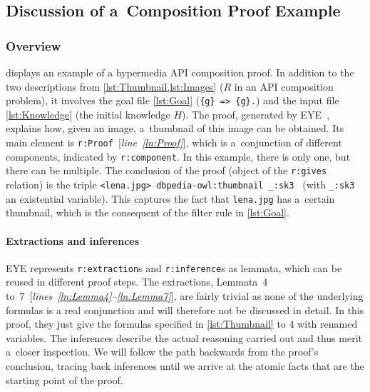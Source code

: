 \newcommand\lineref[1]{[\textit{line~\ref{#1}}]}
\newcommand\linesref[2]{[\textit{lines~\ref{#1}--\ref{#2}}]}


\subsection{Discussion of a~Composition Proof Example}\label{example}
\subsubsection{\bfseries Overview}
 displays an example of a hypermedia API composition proof.
In addition to the two \restdesc descriptions from \cref{lst:Thumbnail,lst:Images}
($R$ in an API composition problem),
it involves the goal file \cref{lst:Goal} (\texttt{\{g\} => \{g\}.})
and the input file \cref{lst:Knowledge} (the initial knowledge $H$).
The proof, generated by EYE~\cite{eyepaper},
explains how, given an image, a~thumbnail of this image can be obtained.
Its main element is \verb!r:Proof!~\lineref{ln:Proof},
which is a~conjunction of different components, indicated by \verb!r:component!.
In this example, there is only one,
but there can be multiple.
The conclusion of the proof
(object of the \verb!r:gives! relation)
is the triple
\verb!<lena.jpg> dbpedia-owl:thumbnail _:sk3 !%
(with \verb!_:sk3! an existential variable).
This captures the fact that \verb!lena.jpg! has a~certain thumbnail,
which is the consequent of the filter rule in \cref{lst:Goal}.

\vspace{-1em}

\paragraph{\bfseries Extractions and inferences}
EYE represents \verb!r:extraction!s and \verb!r:inference!s as lemmata,
which can be reused in different proof steps.
The extractions, Lemmata~4 to~7~\linesref{ln:Lemma4}{ln:Lemma7}, are fairly trivial as none of the underlying formulas is a real conjunction and will therefore not be discussed in detail.
In this proof, they just give the formulas specified in \cref{lst:Thumbnail} to 4 with renamed variables.
The inferences describe the actual reasoning carried out
and thus merit a~closer inspection.
We will follow the path backwards from the proof's conclusion,
tracing back inferences until we arrive at the atomic facts
that are the starting point of the proof.

